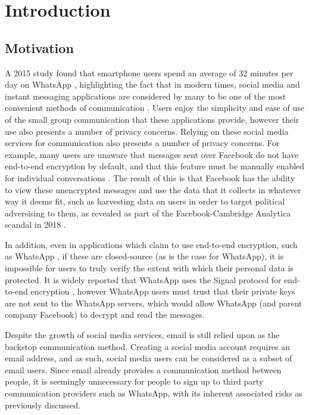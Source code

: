 \chapter{Introduction}


\section{Motivation}

A 2015 study found that smartphone users spend an average of 32 minutes per day on WhatsApp \cite{montag2015}, highlighting the fact that in modern times, social media and instant messaging applications are considered by many to be one of the most convenient methods of communication \cite{church2013}. Users enjoy the simplicity and ease of use of the small group communication that these applications provide, however their use also presents a number of privacy concerns. Relying on these social media services for communication also presents a number of privacy concerns. For example, many users are unaware that messages sent over Facebook do not have end-to-end encryption by default, and that this feature must be manually enabled for individual conversations \cite{facebook2017}. The result of this is that Facebook has the ability to view these unencrypted messages and use the data that it collects in whatever way it deems fit, such as harvesting data on users in order to target political adversising to them, as revealed as part of the Facebook-Cambridge Analytica scandal in 2018 \cite{guardian2018}.

In addition, even in applications which claim to use end-to-end encryption, such as WhatsApp \cite{whatsapp2017}, if these are closed-source (as is the case for WhatsApp), it is impossible for users to truly verify the extent with which their personal data is protected. It is widely reported that WhatsApp uses the Signal protocol for end-to-end encryption \cite{whatsapp2017}, however WhatsApp users must trust that their private keys are not sent to the WhatsApp servers, which would allow WhatsApp (and parent company Facebook) to decrypt and read the messages.

Despite the growth of social media services, email is still relied upon as the backstop communication method. Creating a social media account requires an email address, and as such, social media users can be considered as a subset of email users. Since email already provides a communication method between people, it is seemingly unnecessary for people to sign up to third party communication providers such as WhatsApp, with its inherent associated risks as previously discussed.

